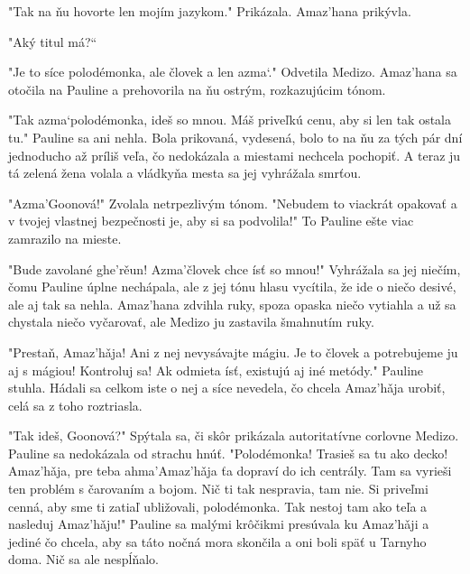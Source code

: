 \documentclass{book}
\begin{document}
"$ $Tak na ňu hovorte len mojím jazykom."$ $ Prikázala. Amaz'hana prikývla.

"$ $Aký titul má?“

"$ $Je to síce polodémonka, ale človek a len azma‘."$ $ Odvetila Medizo. Amaz'hana sa otočila na Pauline a prehovorila na ňu ostrým, rozkazujúcim tónom.

"$ $Tak azma‘polodémonka, ideš so mnou. Máš priveľkú cenu, aby si len tak ostala tu."$ $ Pauline sa ani nehla. Bola prikovaná, vydesená, bolo to na ňu za tých pár dní jednoducho až príliš veľa, čo nedokázala a miestami nechcela pochopiť. A teraz ju tá zelená žena volala a vládkyňa mesta sa jej vyhrážala smrťou.

"$ $Azma'Goonová!"$ $ Zvolala netrpezlivým tónom. "$ $Nebudem to viackrát opakovať a v tvojej vlastnej bezpečnosti je, aby si sa podvolila!"$ $ To Pauline ešte viac zamrazilo na mieste.

"$ $Bude zavolané ghe're\v{}un! Azma'človek chce ísť so mnou!"$ $ Vyhrážala sa jej niečím, čomu Pauline úplne nechápala, ale z jej tónu hlasu vycítila, že ide o niečo desivé, ale aj tak sa nehla. Amaz'hana zdvihla ruky, spoza opaska niečo vytiahla a už sa chystala niečo vyčarovať, ale Medizo ju zastavila šmahnutím ruky.

"$ $Prestaň, Amaz'ha\v{}ja! Ani z nej nevysávajte mágiu. Je to človek a potrebujeme ju aj s mágiou! Kontroluj sa! Ak odmieta ísť, existujú aj iné metódy."$ $ Pauline stuhla. Hádali sa celkom iste o nej a síce nevedela, čo chcela Amaz'ha\v{}ja urobiť, celá sa z toho roztriasla.

"$ $Tak ideš, Goonová?"$ $ Spýtala sa, či skôr prikázala autoritatívne corlovne Medizo. Pauline sa nedokázala od strachu hnúť. "$ $Polodémonka! Trasieš sa tu ako decko! Amaz'ha\v{}ja, pre teba ahma'Amaz'ha\v{}ja ťa dopraví do ich centrály. Tam sa vyrieši ten problém s čarovaním a bojom. Nič ti tak nespravia, tam nie. Si priveľmi cenná, aby sme ti zatiaľ ubližovali, polodémonka. Tak nestoj tam ako teľa a nasleduj Amaz'ha\v{}ju!"$ $ Pauline sa malými krôčikmi presúvala ku Amaz'ha\v{}ji a jediné čo chcela, aby sa táto nočná mora skončila a oni boli späť u Tarnyho doma. Nič sa ale nespĺňalo.
\end{document}

